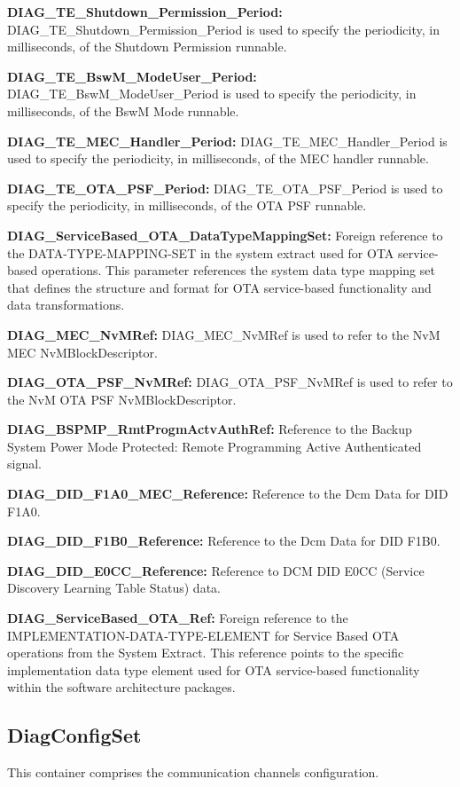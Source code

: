 \textbf{DIAG\_TE\_Shutdown\_Permission\_Period:} DIAG\_TE\_Shutdown\_Permission\_Period is used to specify the periodicity, in milliseconds, of the Shutdown Permission runnable.

\textbf{DIAG\_TE\_BswM\_ModeUser\_Period:} DIAG\_TE\_BswM\_ModeUser\_Period is used to specify the periodicity, in milliseconds, of the BswM Mode runnable.

\textbf{DIAG\_TE\_MEC\_Handler\_Period:} DIAG\_TE\_MEC\_Handler\_Period is used to specify the periodicity, in milliseconds, of the MEC handler runnable.

\textbf{DIAG\_TE\_OTA\_PSF\_Period:} DIAG\_TE\_OTA\_PSF\_Period is used to specify the periodicity, in milliseconds, of the OTA PSF runnable.

\textbf{DIAG\_ServiceBased\_OTA\_DataTypeMappingSet:} Foreign reference to the DATA-TYPE-MAPPING-SET in the system extract used for OTA service-based operations. This parameter references the system data type mapping set that defines the structure and format for OTA service-based functionality and data transformations.

\textbf{DIAG\_MEC\_NvMRef:} DIAG\_MEC\_NvMRef is used to refer to the NvM MEC NvMBlockDescriptor. 

\textbf{DIAG\_OTA\_PSF\_NvMRef:} DIAG\_OTA\_PSF\_NvMRef is used to refer to the NvM OTA PSF NvMBlockDescriptor.

\textbf{DIAG\_BSPMP\_RmtProgmActvAuthRef:} Reference to the Backup System Power Mode Protected: Remote Programming Active Authenticated signal.

\textbf{DIAG\_DID\_F1A0\_MEC\_Reference:} Reference to the Dcm Data for DID F1A0.

\textbf{DIAG\_DID\_F1B0\_Reference:} Reference to the Dcm Data for DID F1B0.

\textbf{DIAG\_DID\_E0CC\_Reference:} Reference to DCM DID E0CC (Service Discovery Learning Table Status) data.

\textbf{DIAG\_ServiceBased\_OTA\_Ref:} Foreign reference to the IMPLEMENTATION-DATA-TYPE-ELEMENT for Service Based OTA operations from the System Extract. This reference points to the specific implementation data type element used for OTA service-based functionality within the software architecture packages.

\subsection{DiagConfigSet}
This container comprises the communication channels configuration.

